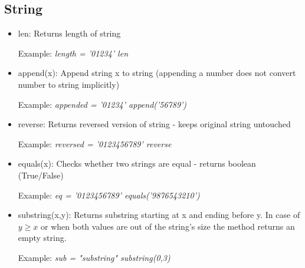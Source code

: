 \documentclass{article}
\begin{document}
\subsection{String}
\begin{itemize}
\item len: Returns length of string

Example: \textit{length = '01234' len}
\item append(x): Append string x to string (appending a number does not convert number to string implicitly)

Example: \textit{appended = '01234' append('56789')}
\item reverse: Returns reversed version of string - keeps original string untouched

Example: \textit{reversed = '0123456789' reverse}
\item equals(x): Checks whether two strings are equal - returns boolean (True/False)

Example: \textit{eq = '0123456789' equals('9876543210')}
\item substring(x,y): Returns substring starting at x and ending before y.
In case of $y \ge x$ or when both values are out of the string's size the method returns an empty string.

Example: \textit{sub = "substring" substring(0,3)}
\end{itemize}
\end{document}
